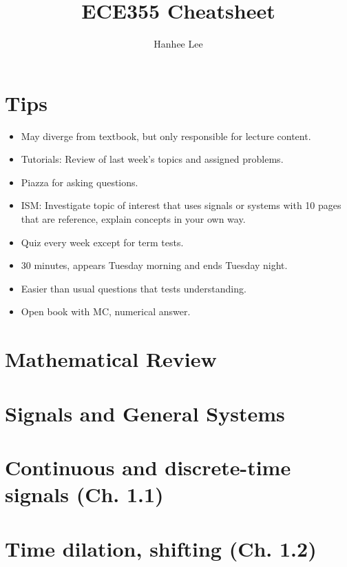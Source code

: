 \documentclass{article}
\title{ECE355 Cheatsheet}
\author{Hanhee Lee}
\begin{document}
\maketitle

\tableofcontents

\listoffigures

\listoftables

\section{Tips}
\begin{intuition}
    \begin{itemize}
        \item May diverge from textbook, but only responsible for lecture content.
        \item Tutorials: Review of last week's topics and assigned problems. 
        \item Piazza for asking questions.
        \item ISM: Investigate topic of interest that uses signals or systems with 10 pages that are reference, explain concepts in your own way.
        \item Quiz every week except for term tests. 
        \item 30 minutes, appears Tuesday morning and ends Tuesday night. 
        \item Easier than usual questions that tests understanding. 
        \item Open book with MC, numerical answer. 
    \end{itemize}
\end{intuition}

\section{Mathematical Review}


\section*{Signals and General Systems}
\section{Continuous and discrete-time signals (Ch. 1.1)}


\section{Time dilation, shifting (Ch. 1.2)}

\end{document}
